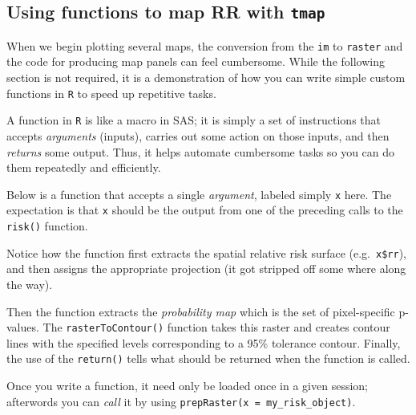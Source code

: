 \documentclass[
]{book}
\begin{document}
\hypertarget{using-functions-to-map-rr-with-tmap}{%
\subsection{\texorpdfstring{Using functions to map RR with \texttt{tmap}}{Using functions to map RR with tmap}}\label{using-functions-to-map-rr-with-tmap}}

When we begin plotting several maps, the conversion from the \texttt{im} to \texttt{raster} and the code for producing map panels can feel cumbersome. While the following section is not required, it is a demonstration of how you can write simple custom functions in \texttt{R} to speed up repetitive tasks.

A function in \texttt{R} is like a macro in SAS; it is simply a set of instructions that accepts \emph{arguments} (inputs), carries out some action on those inputs, and then \emph{returns} some output. Thus, it helps automate cumbersome tasks so you can do them repeatedly and efficiently.

Below is a function that accepts a single \emph{argument}, labeled simply \texttt{x} here. The expectation is that \texttt{x} should be the output from one of the preceding calls to the \texttt{risk()} function.

Notice how the function first extracts the spatial relative risk surface (e.g.~\texttt{x\$rr}), and then assigns the appropriate projection (it got stripped off some where along the way).

Then the function extracts the \emph{probability map} which is the set of pixel-specific p-values. The \texttt{rasterToContour()} function takes this raster and creates contour lines with the specified levels corresponding to a 95\% tolerance contour. Finally, the use of the \texttt{return()} tells what should be returned when the function is called.

Once you write a function, it need only be loaded once in a given session; afterwords you can \emph{call} it by using \texttt{prepRaster(x\ =\ my\_risk\_object)}.
\end{document}
